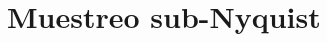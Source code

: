 \documentclass[../../ASSD_TP1_G7.tex]{subfiles}
\begin{document}
\chapter*{Muestreo sub-Nyquist}
\end{document}
